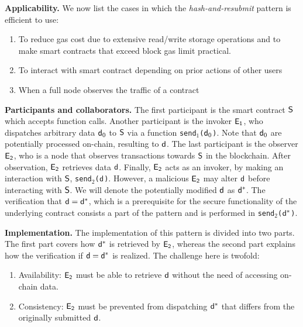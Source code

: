 \noindent
\textbf{Applicability.}
We now list the cases in which the \emph{hash-and-resubmit} pattern is
efficient to use:
\begin{enumerate}
    \item To reduce gas cost due to extensive read/write storage operations
        and to make smart contracts that exceed block gas limit practical.
    \item To interact with smart contract depending on prior actions of other
        users
    \item When a full node observes the traffic of a contract
\end{enumerate}

\noindent \textbf{Participants and collaborators.} The first participant is the
smart contract $\mathsf{S}$ which accepts function calls. Another participant is
the invoker $\mathsf{E_{1}}$, who dispatches arbitrary data $\mathsf{d}_0$ to $\mathsf{S}$
via a function \texttt{send$_1$($\mathsf{d}_0$)}. Note that $\mathsf{d}_0$ are
potentially processed on-chain, resulting to $\mathsf{d}$. The last participant is
the observer $\mathsf{E_{2}}$, who is a node that observes transactions towards
$\mathsf{S}$ in the blockchain. After observation, $\mathsf{E_{2}}$ retrieves data
$\mathsf{d}$. Finally, $\mathsf{E_{2}}$ acts as an invoker, by making an interaction
with $\mathsf{S}$, \texttt{send$_2$($\mathsf{d}$)}. However, a malicious $\mathsf{E_{2}}$
may alter $\mathsf{d}$ before interacting with $\mathsf{S}$. We will denote the
potentially modified $\mathsf{d}$ as $\mathsf{d^*}$. The verification that $\mathsf{d} =
\mathsf{d^*}$, which is a prerequisite for the secure functionality of the underlying
contract consists a part of the pattern and is performed in
\texttt{send$_2$($\mathsf{d^*}$)}.

\noindent \textbf{Implementation.} The implementation of this pattern is
divided into two parts. The first part covers how $\mathsf{d^*}$ is retrieved by
$\mathsf{E_{2}}$, whereas the second part explains how the verification if
$\mathsf{d}=\mathsf{d^*}$ is realized. The challenge here is twofold:

\begin{enumerate}

    \item Availability: $\mathsf{E_{2}}$ must be able to retrieve $\mathsf{d}$ without
        the need of accessing on-chain data.

    \item Consistency: $\mathsf{E_{2}}$ must be prevented from dispatching $\mathsf{d^*}$
        that differs from the originally submitted $\mathsf{d}$.

\end{enumerate}

